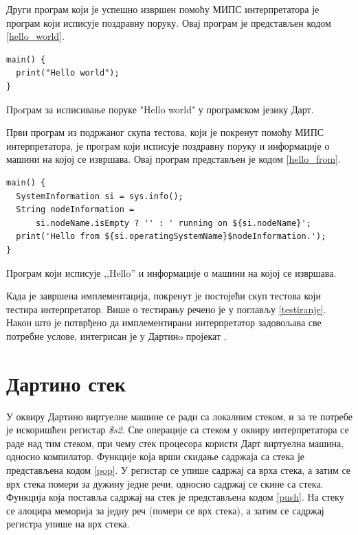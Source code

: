 \documentclass[12pt,oneside]{memoir}
\begin{document}
Други програм који је успешно извршен помоћу МИПС интерпретатора је програм који исписује поздравну поруку. Овај програм је представљен кодом \ref{hello_world}.

\begin{listing}
\begin{verbatim}
main() {
  print("Hello world");
}
\end{verbatim}
\caption{Прoграм за исписивање поруке "Hello world" у програмском језику Дарт.}
\label{hello_world}
\end{listing}

Први програм из подржаног скупа тестова, који је покренут помоћу МИПС интерпретатора, је  програм који исписује поздравну поруку и информације о машини на којој се извршава. Овај програм представљен је кодом \ref{hello_from}.

\begin{listing}
\begin{verbatim}
main() {
  SystemInformation si = sys.info();
  String nodeInformation =
      si.nodeName.isEmpty ? '' : ' running on ${si.nodeName}';
  print('Hello from ${si.operatingSystemName}$nodeInformation.');
}
\end{verbatim}
\caption{Програм који исписује ,,Hello'' и информације о машини на којој се извршава.}
\label{hello_from}
\end{listing}

Када је завршена имплементација, покренут је постојећи скуп тестова који тестира интерпретатор. Више о тестирању речено је у поглављу \ref{testiranje}. Након што је потврђено да имплементирани интерпретатор задовољава све потребне услове, интегрисан је у Дартинo пројекат \cite{interpreterMips}.


\section{Дартино стек}
\label{sec:stek}

У оквиру Дартино виртуелне машине се ради са локалним стеком, и за те потребе је искоришћен регистар \textit{\$s2}. Све операције са стеком у оквиру интерпретатора се раде над тим стеком, при чему стек процесора користи Дарт виртуелна машина, односно компилатор.
Функције која врши скидање садржаја са стека је представљена кодом \ref{pop}. У регистар се упише садржај са врха стека, а затим се врх стека помери за дужину једне речи, односно садржај се скине са стека.
Функција која поставља садржај на стек је представљена кодом \ref{push}. На стеку се алоцира меморија за једну реч (помери се врх стека), а затим се садржај регистра упише на врх стека.\\
\end{document}
